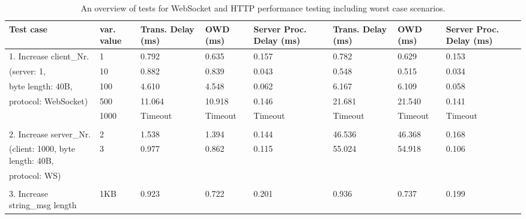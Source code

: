     \begin{table}[htbp]
    \footnotesize
    \centering
    \caption{An overview of tests for WebSocket and HTTP performance testing including worst case scenarios.}
    \label{tab: TestsProportional}
    \begin{tabular}{m{} m{} m{} m{} m{} m{} m{} m{}}
    \hline
    \textbf{Test case}                        & \textbf{var. value} & \textbf{Trans. Delay (ms)} & \textbf{OWD (ms)} & \textbf{Server Proc. Delay (ms)} & \textbf{Trans. Delay (ms)} & \textbf{OWD (ms)} & \textbf{Server Proc. Delay (ms)} \\ \hline
    1. Increase client\_Nr.          & 1          & 0.792             & 0.635    & 0.157                   & 0.782             & 0.629    & 0.153                   \\
    (server: 1,                      & 10         & 0.882             & 0.839    & 0.043                   & 0.548             & 0.515    & 0.034                   \\
    byte length: 40B,                & 100        & 4.610             & 4.548    & 0.062                   & 6.167             & 6.109    & 0.058                   \\
    protocol: WebSocket)             & 500        & 11.064            & 10.918   & 0.146                   & 21.681            & 21.540   & 0.141                   \\
                                     & 1000       & Timeout           & Timeout  & Timeout                 & Timeout           & Timeout  & Timeout                 \\
    & & & & & & &\\
    2. Increase server\_Nr.          & 2          & 1.538             & 1.394    & 0.144                   & 46.536            & 46.368   & 0.168                   \\
    (client: 1000, byte length: 40B, & 3          & 0.977             & 0.862    & 0.115                   & 55.024            & 54.918   & 0.106                   \\
    protocol: WS)                    &            &                   &          &                         &                   &          &                         \\
    & & & & & & &\\
    3. Increase string\_msg length   & 1KB        & 0.923             & 0.722    & 0.201                   & 0.936             & 0.737    & 0.199                   \\

\end{tabular}
\end{table}

